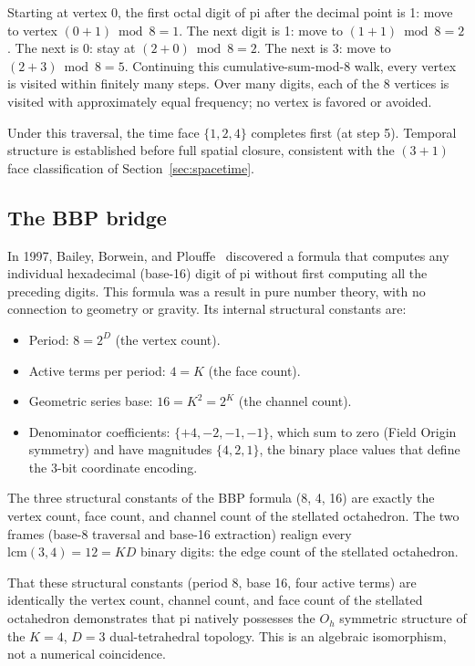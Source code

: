 \documentclass[twocolumn]{iopjournal}
\begin{document}
Starting at vertex 0, the first octal digit of pi after the decimal point is 1: move to vertex $(0 + 1) \bmod 8 = 1$. The next digit is 1: move to $(1 + 1) \bmod 8 = 2$. The next is 0: stay at $(2 + 0) \bmod 8 = 2$. The next is 3: move to $(2 + 3) \bmod 8 = 5$. Continuing this cumulative-sum-mod-8 walk, every vertex is visited within finitely many steps. Over many digits, each of the 8 vertices is visited with approximately equal frequency; no vertex is favored or avoided.

Under this traversal, the time face $\{1, 2, 4\}$ completes first (at step 5). Temporal structure is established before full spatial closure, consistent with the $(3+1)$ face classification of Section~\ref{sec:spacetime}.

\subsection{The BBP bridge}

In 1997, Bailey, Borwein, and Plouffe~\cite{BBP1997} discovered a formula that computes any individual hexadecimal (base-16) digit of pi without first computing all the preceding digits. This formula was a result in pure number theory, with no connection to geometry or gravity. Its internal structural constants are:
\begin{itemize}
\item Period: $8 = 2^D$ (the vertex count).
\item Active terms per period: $4 = K$ (the face count).
\item Geometric series base: $16 = K^2 = 2^K$ (the channel count).
\item Denominator coefficients: $\{+4, -2, -1, -1\}$, which sum to zero (Field Origin symmetry) and have magnitudes $\{4, 2, 1\}$, the binary place values that define the 3-bit coordinate encoding.
\end{itemize}
The three structural constants of the BBP formula (8, 4, 16) are exactly the vertex count, face count, and channel count of the stellated octahedron. The two frames (base-8 traversal and base-16 extraction) realign every $\text{lcm}(3, 4) = 12 = KD$ binary digits: the edge count of the stellated octahedron.

That these structural constants (period 8, base 16, four active terms) are identically the vertex count, channel count, and face count of the stellated octahedron demonstrates that pi natively possesses the $O_h$ symmetric structure of the $K = 4$, $D = 3$ dual-tetrahedral topology. This is an algebraic isomorphism, not a numerical coincidence.
\end{document}
